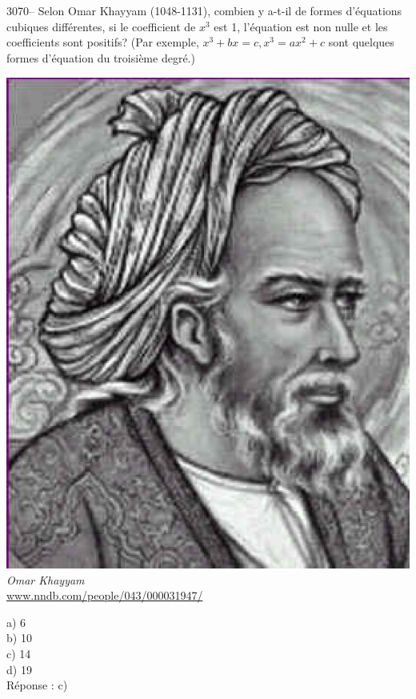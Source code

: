 \documentclass[letterpaper, 12pt]{article}
\begin{document}
3070-- Selon Omar Khayyam (1048-1131), combien y a-t-il de formes d'\'equations cubiques diff\'erentes, si le coefficient de $x^{3}$ est 1, l'\'equation est non nulle et les coefficients sont positifs? (Par exemple, $x^{3} + bx = c, x^{3} = ax^{2} + c$ sont quelques formes d'\'equation du troisi\`eme degr\'e.)
\begin{center}
\includegraphics[scale=0.3]{Omar_Khayyam.eps}\\
\emph{{\small Omar Khayyam}}\\
\href{http://www.nndb.com/people/043/000031947/}{www.nndb.com/people/043/000031947/}\\
\end{center}

a) 6\\
b) 10\\
c) 14\\
d) 19\\

R\'eponse : c)\\
\end{document}
